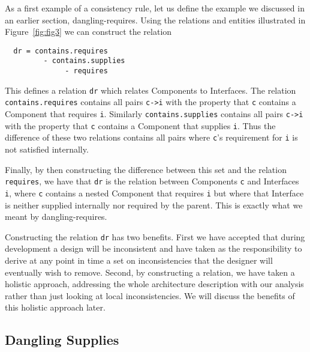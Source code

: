 \documentclass[a4paper,twoside]{article}
\begin{document}
\noindent As a first example of a consistency rule, let us define the example we discussed in an earlier section, dangling-requires. Using the relations and entities illustrated in Figure~\ref{fig:fig3} we can construct the relation
\begin{small}
\begin{verbatim}
  dr = contains.requires 
         - contains.supplies 
              - requires 
\end{verbatim}
\end{small}
This defines a relation {\small\verb$dr$} which relates Components to Interfaces. The relation {\small\verb$contains.requires$} contains all pairs {\small\verb$c->i$} with the property that {\small\verb$c$} contains a Component that requires {\small\verb$i$}. Similarly {\small\verb$contains.supplies$} contains all pairs {\small\verb$c->i$} with the property that {\small\verb$c$} contains a Component that supplies {\small\verb$i$}. Thus the difference of these two relations contains all pairs where {\small\verb$c$}'s requirement for {\small\verb$i$} is not satisfied internally. 

Finally, by then constructing the difference between this set and the relation {\small\verb$requires$}, we have that {\small\verb$dr$} is the relation between Components {\small\verb$c$} and Interfaces {\small\verb$i$}, where {\small\verb$c$} contains a nested Component that requires {\small\verb$i$} but where that Interface is neither supplied internally nor required by the parent. This is exactly what we meant by dangling-requires.

Constructing the relation {\small\verb$dr$} has two benefits. First we have accepted that during development a design will be inconsistent and have taken as the responsibility to derive at any point in time a set on inconsistencies that the designer will eventually wish to remove. Second, by constructing a relation, we have taken a holistic approach, addressing the whole architecture description with our analysis rather than just looking at local inconsistencies. We will discuss the benefits of this holistic approach later. 

\subsection{Dangling Supplies}
\end{document}
